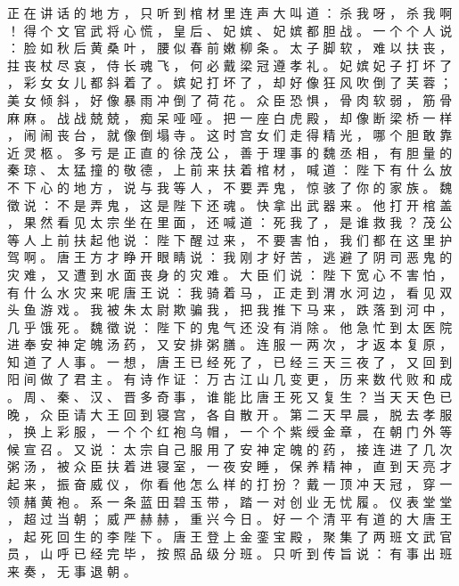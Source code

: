 {正 在 讲 话 的 地 方 ， 只 听 到 棺 材 里 连 声 大 叫 道 ： 杀 我 呀 ， 杀 我 啊 ！ 得 个 文 官 武 将 心 慌 ， 皇 后 、 妃 嫔 、 妃 嫔 都 胆 战 。
一 个 个 人 说 ： 脸 如 秋 后 黄 桑 叶 ， 腰 似 春 前 嫩 柳 条 。
太 子 脚 软 ， 难 以 扶 丧 ， 拄 丧 杖 尽 哀 ， 侍 长 魂 飞 ， 何 必 戴 梁 冠 遵 孝 礼 。
妃 嫔 妃 子 打 坏 了 ， 彩 女 女 儿 都 斜 着 了 。
嫔 妃 打 坏 了 ， 却 好 像 狂 风 吹 倒 了 芙 蓉 ； 美 女 倾 斜 ， 好 像 暴 雨 冲 倒 了 荷 花 。
众 臣 恐 惧 ， 骨 肉 软 弱 ， 筋 骨 麻 麻 。
战 战 兢 兢 ， 痴 呆 哑 哑 。
把 一 座 白 虎 殿 ， 却 像 断 梁 桥 一 样 ， 闹 闹 丧 台 ， 就 像 倒 塌 寺 。
这 时 宫 女 们 走 得 精 光 ， 哪 个 胆 敢 靠 近 灵 柩 。
多 亏 是 正 直 的 徐 茂 公 ， 善 于 理 事 的 魏 丞 相 ， 有 胆 量 的 秦 琼 、 太 猛 撞 的 敬 德 ， 上 前 来 扶 着 棺 材 ， 喊 道 ： 陛 下 有 什 么 放 不 下 心 的 地 方 ， 说 与 我 等 人 ， 不 要 弄 鬼 ， 惊 骇 了 你 的 家 族 。
魏 徵 说 ： 不 是 弄 鬼 ， 这 是 陛 下 还 魂 。
快 拿 出 武 器 来 。
他 打 开 棺 盖 ， 果 然 看 见 太 宗 坐 在 里 面 ， 还 喊 道 ： 死 我 了 ， 是 谁 救 我 ？ 茂 公 等 人 上 前 扶 起 他 说 ： 陛 下 醒 过 来 ， 不 要 害 怕 ， 我 们 都 在 这 里 护 驾 啊 。
唐 王 方 才 睁 开 眼 睛 说 ： 我 刚 才 好 苦 ， 逃 避 了 阴 司 恶 鬼 的 灾 难 ， 又 遭 到 水 面 丧 身 的 灾 难 。
大 臣 们 说 ： 陛 下 宽 心 不 害 怕 ， 有 什 么 水 灾 来 呢 唐 王 说 ： 我 骑 着 马 ， 正 走 到 渭 水 河 边 ， 看 见 双 头 鱼 游 戏 。
我 被 朱 太 尉 欺 骗 我 ， 把 我 推 下 马 来 ， 跌 落 到 河 中 ， 几 乎 饿 死 。
魏 徵 说 ： 陛 下 的 鬼 气 还 没 有 消 除 。
他 急 忙 到 太 医 院 进 奉 安 神 定 魄 汤 药 ， 又 安 排 粥 膳 。
连 服 一 两 次 ， 才 返 本 复 原 ， 知 道 了 人 事 。
一 想 ， 唐 王 已 经 死 了 ， 已 经 三 天 三 夜 了 ， 又 回 到 阳 间 做 了 君 主 。
有 诗 作 证 ： 万 古 江 山 几 变 更 ， 历 来 数 代 败 和 成 。
周 、 秦 、 汉 、 晋 多 奇 事 ， 谁 能 比 唐 王 死 又 复 生 ？ 当 天 天 色 已 晚 ， 众 臣 请 大 王 回 到 寝 宫 ， 各 自 散 开 。
第 二 天 早 晨 ， 脱 去 孝 服 ， 换 上 彩 服 ， 一 个 个 红 袍 乌 帽 ， 一 个 个 紫 绶 金 章 ， 在 朝 门 外 等 候 宣 召 。
又 说 ： 太 宗 自 己 服 用 了 安 神 定 魄 的 药 ， 接 连 进 了 几 次 粥 汤 ， 被 众 臣 扶 着 进 寝 室 ， 一 夜 安 睡 ， 保 养 精 神 ， 直 到 天 亮 才 起 来 ， 振 奋 威 仪 ， 你 看 他 怎 么 样 的 打 扮 ？ 戴 一 顶 冲 天 冠 ， 穿 一 领 赭 黄 袍 。
系 一 条 蓝 田 碧 玉 带 ， 踏 一 对 创 业 无 忧 履 。
仪 表 堂 堂 ， 超 过 当 朝 ； 威 严 赫 赫 ， 重 兴 今 日 。
好 一 个 清 平 有 道 的 大 唐 王 ， 起 死 回 生 的 李 陛 下 。
唐 王 登 上 金 銮 宝 殿 ， 聚 集 了 两 班 文 武 官 员 ， 山 呼 已 经 完 毕 ， 按 照 品 级 分 班 。
只 听 到 传 旨 说 ： 有 事 出 班 来 奏 ， 无 事 退 朝 。
}
